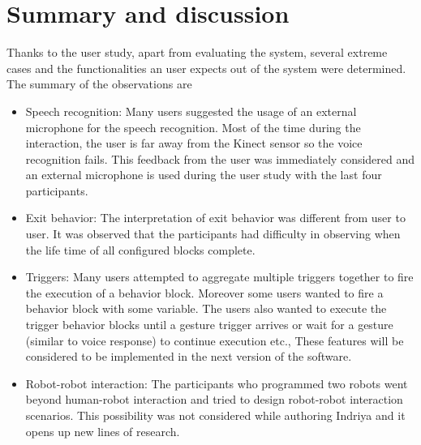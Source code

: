 \section{Summary and discussion}
Thanks to the user study, apart from evaluating the system, several extreme cases and the functionalities an user expects out of the system were determined. The summary of the observations are
\begin{itemize}
\item Speech recognition: Many users suggested the usage of an external microphone for the speech recognition. Most of the time during the interaction, the user is far away from the Kinect sensor so the voice recognition fails. This feedback from the user was immediately considered and an external microphone is used during the user study with the last four participants. 
\item Exit behavior: The interpretation of exit behavior was different from user to user. It was observed that the participants had difficulty in observing when the life time of all configured blocks complete.
\item Triggers: Many users attempted to aggregate multiple triggers together to fire the execution of a behavior block. Moreover some users wanted to fire a behavior block with some variable. The users also wanted to execute the trigger behavior blocks until a gesture trigger arrives or wait for a gesture (similar to voice response) to continue execution etc., These features will be considered to be implemented in the next version of the software.
\item Robot-robot interaction: The participants who programmed two robots went beyond human-robot interaction and tried to design robot-robot interaction scenarios. This possibility was not considered while authoring Indriya and it opens up new lines of research.
\end{itemize}